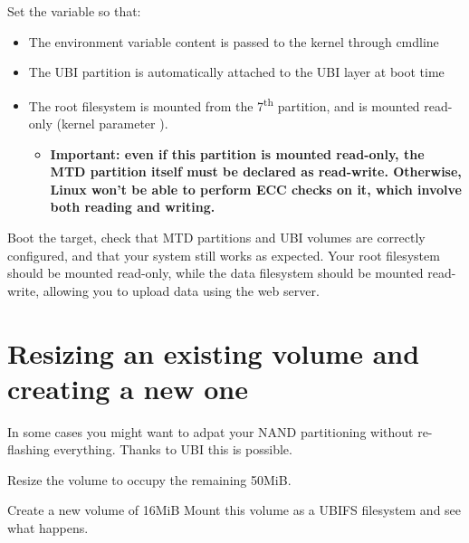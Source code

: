 Set the  variable so that:

\begin{itemize}
\item The  environment variable content is passed to
  the kernel through cmdline
\item The UBI partition is automatically attached to the UBI layer at
  boot time
\item The root filesystem is mounted from the 7\textsuperscript{th}
  partition, and is mounted read-only (kernel parameter
  ).
  \begin{itemize}
  \item \bf{Important: even if this partition is mounted read-only,
      the MTD partition itself must be declared as read-write.
      Otherwise, Linux won't be able to perform ECC checks on it,
      which involve both reading and writing.}
  \end{itemize}
\end{itemize}

Boot the target, check that MTD partitions and UBI volumes are correctly
configured, and that your system still works as expected. Your root
filesystem should be mounted read-only, while the data filesystem should
be mounted read-write, allowing you to upload data using the web server.


\section{Resizing an existing volume and creating a new one}

In some cases you might want to adpat your NAND partitioning without
re-flashing everything. Thanks to UBI this is possible.

Resize the  volume to occupy the remaining 50MiB.

Create a new  volume of 16MiB
Mount this volume as a UBIFS filesystem and see what happens.

